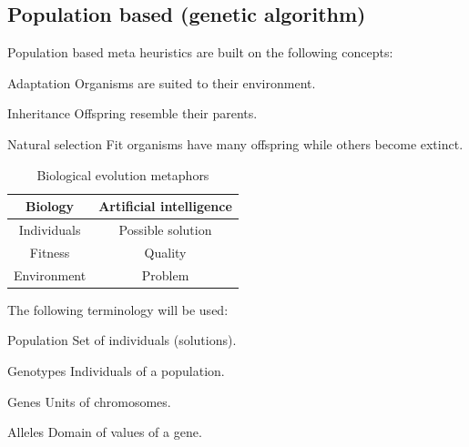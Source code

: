 \subsection{Population based (genetic algorithm)}

Population based meta heuristics are built on the following concepts:
\begin{descriptionlist}
    \item[Adaptation] Organisms are suited to their environment.
    \item[Inheritance] Offspring resemble their parents.
    \item[Natural selection] Fit organisms have many offspring while others become extinct.
\end{descriptionlist}

\begin{table}[ht]
    \centering
    \begin{tabular}{c | c}
        \textbf{Biology} & \textbf{Artificial intelligence} \\
        \hline
        Individuals & Possible solution \\
        Fitness & Quality \\
        Environment & Problem \\
    \end{tabular}
    \caption{Biological evolution metaphors}
\end{table}

The following terminology will be used:
\begin{descriptionlist}
    \item[Population] Set of individuals (solutions).
    \item[Genotypes] Individuals of a population.
    \item[Genes] Units of chromosomes.
    \item[Alleles] Domain of values of a gene.
\end{descriptionlist}

